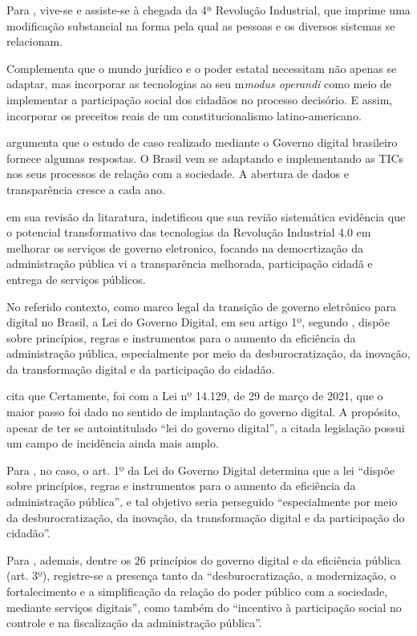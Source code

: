Para \cite{kreuz20184textordfeminine}, vive-se e assiste-se à chegada da 4ª Revolução Industrial, que imprime uma modificação substancial na forma pela qual as pessoas e os diversos sistemas se relacionam. 

Complementa \cite{kreuz20184textordfeminine} que o mundo jurídico e o poder estatal necessitam não apenas se adaptar, mas incorporar as tecnologias ao seu m\textit{modus operandi} como meio de implementar a participação social dos cidadãos no processo decisório. E assim, incorporar os preceitos reais de um constitucionalismo latino-americano.

\cite{kreuz20184textordfeminine} argumenta que o estudo de caso realizado mediante o Governo digital brasileiro fornece algumas respostas. O Brasil vem se adaptando e implementando as TICs nos seus processos de relação com a sociedade. A abertura de dados e transparência cresce a cada ano. 

\cite{kenosi2024industrial} em sua revisão da litaratura, indetificou que sua revião sistemática evidência que o potencial transformativo das tecnologias da Revolução Industrial 4.0 em melhorar os serviços de governo eletronico, focando na democrtização da administração pública vi a transparência melhorada, participação cidadã e entrega de serviços públicos.

No referido contexto, como marco legal da transição de governo eletrônico para digital  no Brasil, a Lei do Governo Digital, em seu artigo 1º, segundo \cite{l14129},  dispõe sobre princípios, regras e instrumentos para o aumento da eficiência da administração pública, especialmente por meio da desburocratização, da inovação, da transformação digital e da participação do cidadão.

\cite{carvalho2022nova} cita que Certamente, foi com a Lei nº 14.129, de 29 de março de 2021, que o maior passo foi dado no sentido de implantação do governo digital. A propósito, apesar de ter se autointitulado “lei do governo digital”, a citada legislação possui um campo de incidência ainda mais amplo.

Para \cite{carvalho2022nova}, no caso, o art. 1º da Lei do Governo Digital determina que a lei “dispõe sobre princípios, regras e instrumentos para o aumento da eficiência da administração pública”, e tal objetivo seria perseguido “especialmente por meio da desburocratização, da inovação, da  transformação digital e da participação do cidadão”. 

Para \cite{carvalho2022nova}, ademais, dentre os 26 princípios do governo digital e da eficiência pública (art. 3º), registre-se a presença tanto da “desburocratização, a modernização, o fortalecimento e a simplificação da relação do poder público com a sociedade, 
mediante serviços digitais”, como também do “incentivo à participação social no controle e na fiscalização da administração pública”.

